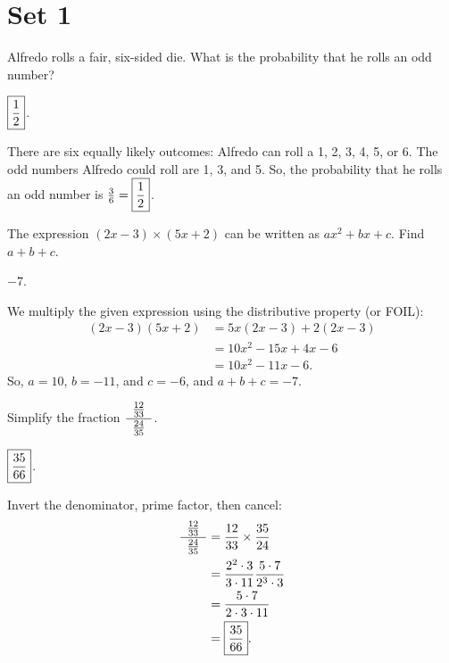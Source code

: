 \documentclass[11pt]{article}
\DeclareRobustCommand{\frac}[3][0pt]{%
  {\begingroup\hspace{#1}#2\hspace{#1}\endgroup\over\hspace{#1}#3\hspace{#1}}}
\begin{document}
\section*{Set 1}

\begin{problem}
Alfredo rolls a fair, six-sided die. What is the probability that he rolls an odd number?
\end{problem}

\begin{answer} $\boxed{\frac{1}{2}}$. \end{answer}
\begin{solution}
There are six equally likely outcomes: Alfredo can roll a 1, 2, 3, 4, 5, or 6. The odd numbers Alfredo could roll are 1, 3, and 5. So, the probability that he rolls an odd number is $\frac{3}{6} = \boxed{\frac{1}{2}}$.
\end{solution}

\begin{problem}
The expression $(2x - 3) \times (5x + 2)$ can be written as $ax^2 + bx + c$. Find $a + b+ c$.
\end{problem}

\begin{answer} $\boxed{-7}$. \end{answer}
\begin{solution}
We multiply the given expression using the distributive property (or FOIL):
\begin{align*}
(2x - 3)(5x + 2) &= 5x(2x - 3) + 2(2x - 3) \\
&= 10x^2 - 15x + 4x - 6 \\
&= 10x^2 - 11x - 6.
\end{align*}
So, $a = 10$, $b = -11$, and $c = -6$, and $a + b + c = \boxed{-7}$.
\end{solution}

\begin{problem}
Simplify the fraction $\displaystyle \frac[5pt]{\frac{12}{33}} {\frac{24}{35}}$.
\end{problem}

\begin{answer} $\boxed{\frac{35}{66}}$. \end{answer}
\begin{solution}
Invert the denominator, prime factor, then cancel:
\begin{align*}
\frac[5pt]{\frac{12}{33}} {\frac{24}{35}} &= \frac{12}{33} \times \frac{35}{24} \\
&= \frac{2^2 \cdot 3}{3 \cdot 11} \frac{5 \cdot 7}{2^3 \cdot 3} \\
&= \frac{5 \cdot 7}{2 \cdot 3 \cdot 11} \\
&= \boxed{\frac{35}{66}}.
\end{align*}
\end{solution}
\end{document}
